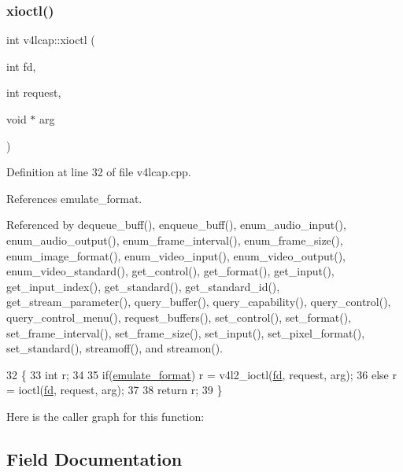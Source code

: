 \subsubsection{\texorpdfstring{xioctl()}{xioctl()}}
{\footnotesize\ttfamily int v4lcap\+::xioctl (\begin{DoxyParamCaption}\item[{int}]{fd,  }\item[{int}]{request,  }\item[{void $\ast$}]{arg }\end{DoxyParamCaption})}



Definition at line 32 of file v4lcap.\+cpp.



References emulate\+\_\+format.



Referenced by dequeue\+\_\+buff(), enqueue\+\_\+buff(), enum\+\_\+audio\+\_\+input(), enum\+\_\+audio\+\_\+output(), enum\+\_\+frame\+\_\+interval(), enum\+\_\+frame\+\_\+size(), enum\+\_\+image\+\_\+format(), enum\+\_\+video\+\_\+input(), enum\+\_\+video\+\_\+output(), enum\+\_\+video\+\_\+standard(), get\+\_\+control(), get\+\_\+format(), get\+\_\+input(), get\+\_\+input\+\_\+index(), get\+\_\+standard(), get\+\_\+standard\+\_\+id(), get\+\_\+stream\+\_\+parameter(), query\+\_\+buffer(), query\+\_\+capability(), query\+\_\+control(), query\+\_\+control\+\_\+menu(), request\+\_\+buffers(), set\+\_\+control(), set\+\_\+format(), set\+\_\+frame\+\_\+interval(), set\+\_\+frame\+\_\+size(), set\+\_\+input(), set\+\_\+pixel\+\_\+format(), set\+\_\+standard(), streamoff(), and streamon().


\begin{DoxyCode}
32                                                   \{
33     \textcolor{keywordtype}{int} r;
34 
35     \textcolor{keywordflow}{if}(\hyperlink{classv4lcap_a21b4c152f56ecc309a490cb8ab4ce117}{emulate\_format}) r = v4l2\_ioctl(\hyperlink{classv4lcap_a38109593bde997dad13b3a461569573d}{fd}, request, arg);
36     \textcolor{keywordflow}{else} r = ioctl(\hyperlink{classv4lcap_a38109593bde997dad13b3a461569573d}{fd}, request, arg);
37 
38     \textcolor{keywordflow}{return} r;
39 \}
\end{DoxyCode}
Here is the caller graph for this function\+:


\subsection{Field Documentation}
\mbox{\label{classv4lcap_a046084072d2279bb204ed93cd2692700}} 
